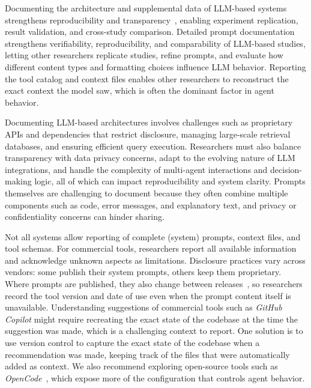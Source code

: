 
Documenting the architecture and supplemental data of LLM-based systems strengthens reproducibility and transparency~\cite{DBLP:journals/software/LuZXXW24}, enabling experiment replication, result validation, and cross-study comparison.
Detailed prompt documentation strengthens verifiability, reproducibility, and comparability of LLM-based studies, letting other researchers replicate studies, refine prompts, and evaluate how different content types and formatting choices influence LLM behavior.
Reporting the tool catalog and context files enables other researchers to reconstruct the exact context the model saw, which is often the dominant factor in agent behavior.


Documenting LLM-based architectures involves challenges such as proprietary APIs and dependencies that restrict disclosure, managing large-scale retrieval databases, and ensuring efficient query execution.
Researchers must also balance transparency with data privacy concerns, adapt to the evolving nature of LLM integrations, and handle the complexity of multi-agent interactions and decision-making logic, all of which can impact reproducibility and system clarity.
Prompts themselves are challenging to document because they often combine multiple components such as code, error messages, and explanatory text, and privacy or confidentiality concerns can hinder sharing.

Not all systems allow reporting of complete (system) prompts, context files, and tool schemas.
For commercial tools, researchers \must report all available information and acknowledge unknown aspects as limitations.
Disclosure practices vary across vendors: some publish their system prompts, others keep them proprietary.
Where prompts are published, they also change between releases~\cite{willison2026opus}, so researchers \should record the tool version and date of use even when the prompt content itself is unavailable.
Understanding suggestions of commercial tools such as \emph{GitHub Copilot} might require recreating the exact state of the codebase at the time the suggestion was made, which is a challenging context to report.
One solution is to use version control to capture the exact state of the codebase when a recommendation was made, keeping track of the files that were automatically added as context.
We also recommend exploring open-source tools such as \emph{OpenCode}~\cite{opencode}, which expose more of the configuration that controls agent behavior.

